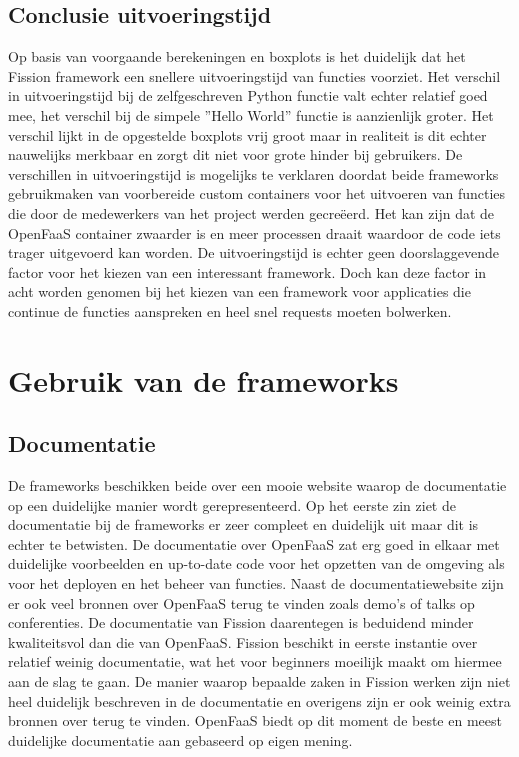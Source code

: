 \subsection{Conclusie uitvoeringstijd}
Op basis van voorgaande berekeningen en boxplots is het duidelijk dat het Fission framework een snellere uitvoeringstijd van functies voorziet. Het verschil in uitvoeringstijd bij de zelfgeschreven Python functie valt echter relatief goed mee, het verschil bij de simpele ''Hello World'' functie is aanzienlijk groter. Het verschil lijkt in de opgestelde boxplots vrij groot maar in realiteit is dit echter nauwelijks merkbaar en zorgt dit niet voor grote hinder bij gebruikers. De verschillen in uitvoeringstijd is mogelijks te verklaren doordat beide frameworks gebruikmaken van voorbereide custom containers voor het uitvoeren van functies die door de medewerkers van het project werden gecreëerd. Het kan zijn dat de OpenFaaS container zwaarder is en meer processen draait waardoor de code iets trager uitgevoerd kan worden. De uitvoeringstijd is echter geen doorslaggevende factor voor het kiezen van een interessant framework. Doch kan deze factor in acht worden genomen bij het kiezen van een framework voor applicaties die continue de functies aanspreken en heel snel requests moeten bolwerken.

\section{Gebruik van de frameworks}
\subsection{Documentatie}
De frameworks beschikken beide over een mooie website waarop de documentatie op een duidelijke manier wordt gerepresenteerd. Op het eerste zin ziet de documentatie bij de frameworks er zeer compleet en duidelijk uit maar dit is echter te betwisten. De documentatie over OpenFaaS zat erg goed in elkaar met duidelijke voorbeelden en up-to-date code voor het opzetten van de omgeving als voor het deployen en het beheer van functies. Naast de documentatiewebsite zijn er ook veel bronnen over OpenFaaS terug te vinden zoals demo's of talks op conferenties. De documentatie van Fission daarentegen is beduidend minder kwaliteitsvol dan die van OpenFaaS. Fission beschikt in eerste instantie over relatief weinig documentatie, wat het voor beginners moeilijk maakt om hiermee aan de slag te gaan. De manier waarop bepaalde zaken in Fission werken zijn niet heel duidelijk beschreven in de documentatie en overigens zijn er ook weinig extra bronnen over terug te vinden. OpenFaaS biedt op dit moment de beste en meest duidelijke documentatie aan gebaseerd op eigen mening.

